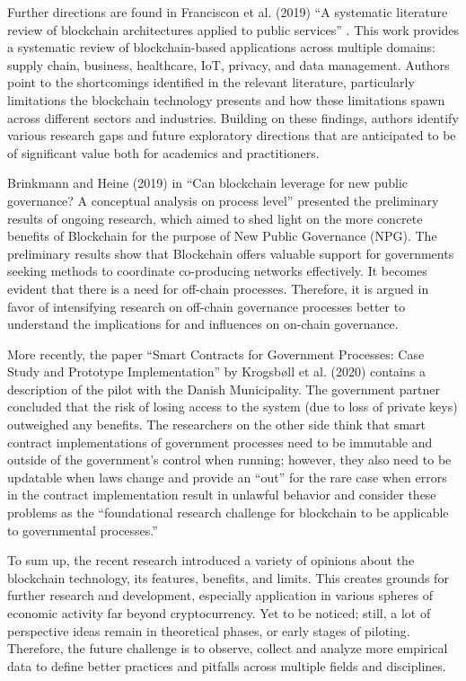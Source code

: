 \begin{multicols}{2}
Further directions are found in Franciscon et al. (2019) “A systematic literature review of blockchain architectures applied to public services” \cite{art1-key12}. This work provides a systematic review of blockchain-based applications across multiple domains: supply chain, business, healthcare, IoT, privacy, and data management. Authors point to the shortcomings identified in the relevant literature, particularly limitations the blockchain technology presents and how these limitations spawn across different sectors and industries. Building on these findings, authors identify various research gaps and future exploratory directions that are anticipated to be of significant value both for academics and practitioners.

 Brinkmann and Heine (2019) in “Can blockchain leverage for new public governance? A conceptual analysis on process level” \cite{art1-key13} presented the preliminary results of ongoing research, which aimed to shed light on the more concrete benefits of Blockchain for the purpose of New Public Governance (NPG). The preliminary results show that Blockchain offers valuable support for governments seeking methods to coordinate co-producing networks effectively. It becomes evident that there is a need for off-chain processes. Therefore, it is argued in favor of intensifying research on off-chain governance processes better to understand the implications for and influences on on-chain governance.
 
More recently, the paper “Smart Contracts for Government Processes: Case Study and Prototype Implementation” \cite{art1-key14} by Krogsbøll et al. (2020) contains a description of the pilot with the Danish Municipality. The government partner concluded that the risk of losing access to the system (due to loss of private keys) outweighed any benefits. The researchers on the other side think that smart contract implementations of government processes need to be immutable and outside of the government’s control when running; however, they also need to be updatable when laws change and provide an “out” for the rare case when errors in the contract implementation result in unlawful behavior and consider these problems as the “foundational research challenge for blockchain to be applicable to governmental processes.”

To sum up, the recent research introduced a variety of opinions about the blockchain technology, its features, benefits, and limits. This creates grounds for further research and development, especially application in various spheres of economic activity far beyond cryptocurrency. Yet to be noticed; still, a lot of perspective ideas remain in theoretical phases, or early stages of piloting. Therefore, the future challenge is to observe, collect and analyze more empirical data to define better practices and pitfalls across multiple fields and disciplines.


\end{multicols}
